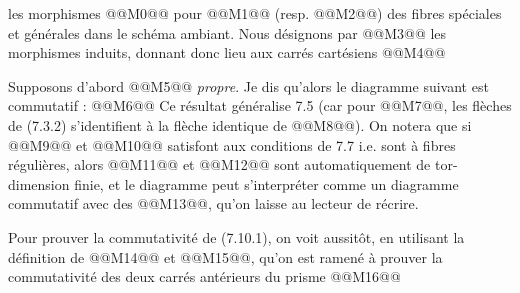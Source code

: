
les morphismes @@M0@@ pour @@M1@@ (resp. @@M2@@) des fibres spéciales et générales dans le schéma ambiant. Nous désignons par
@@M3@@
les morphismes induits, donnant donc lieu aux carrés cartésiens
@@M4@@

Supposons d'abord @@M5@@ \emph{propre}. Je dis qu'alors le diagramme suivant est commutatif :
@@M6@@
Ce résultat généralise 7.5 (car pour @@M7@@, les flèches de (7.3.2) s'identifient à la flèche identique de @@M8@@). On notera que si @@M9@@ et @@M10@@ satisfont aux conditions de 7.7 i.e. sont à fibres régulières, alors @@M11@@ et @@M12@@ sont automatiquement de tor-dimension finie, et le diagramme peut s'interpréter comme un diagramme commutatif avec des @@M13@@, qu'on laisse au lecteur de récrire.

Pour prouver la commutativité de (7.10.1), on voit aussitôt, en utilisant la définition de @@M14@@ et @@M15@@, qu'on est ramené à prouver la commutativité des deux carrés antérieurs du prisme
@@M16@@
